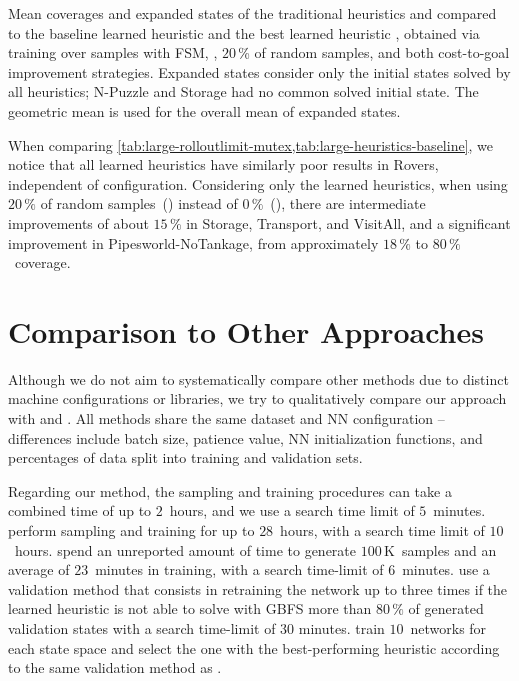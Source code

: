 \begin{table}[tb]
    \caption[Results of the traditional heuristics, the baseline, and our approach.]{Mean coverages and expanded states of the traditional heuristics \hff and \hgc compared to the baseline learned heuristic \hnnbase and the best learned heuristic \hnnrs, obtained via training over samples with FSM, \rlmeanfx, $20$\,\% of random samples, and both cost-to-goal improvement strategies. Expanded states consider only the initial states solved by all heuristics; N-Puzzle and Storage had no common solved initial state. The geometric mean is used for the overall mean of expanded states.}
    \label{tab:large-heuristics-baseline}
    \addmargin
    \centering
    
\end{table}

When comparing \cref{tab:large-rolloutlimit-mutex,tab:large-heuristics-baseline}, we notice that all learned heuristics have similarly poor results in Rovers, independent of configuration. Considering only the learned heuristics, when using $20\,\%$ of random samples~(\hnnrs) instead of $0\,\%$~(\hnnl{\rlmeanfx}), there are intermediate improvements of about $15\,\%$ in Storage, Transport, and VisitAll, and a significant improvement in Pipesworld-NoTankage, from approximately $18\,\%$ to $80\,\%$~coverage.

\section{Comparison to Other Approaches}
\label{sec:large-exps-comparison}

Although we do not aim to systematically compare other methods due to distinct machine configurations or libraries, we try to qualitatively compare our approach with \citet{ferber2022neural} and \citet{otoole2022sampling}. All methods share the same dataset and NN configuration -- differences include batch size, patience value, NN initialization functions, and percentages of data split into training and validation sets.

Regarding our method, the sampling and training procedures can take a combined time of up to $2$~hours, and we use a search time limit of $5$~minutes. \citet{ferber2022neural} perform sampling and training for up to $28$~hours, with a search time limit of $10$~hours. \citet{otoole2022sampling} spend an unreported amount of time to generate $100$\,K~samples and an average of $23$~minutes in training, with a search time-limit of $6$~minutes. \citet{ferber2022neural} use a validation method that consists in retraining the network up to three times if the learned heuristic is not able to solve with GBFS more than $80\,\%$ of generated validation states with a search time-limit of $30$ minutes. \citet{otoole2022sampling} train $10$~networks for each state space and select the one with the best-performing heuristic according to the same validation method as \citet{ferber2022neural}.

